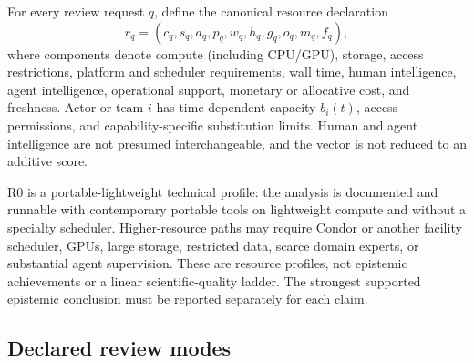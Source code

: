 \documentclass[11pt]{article}
\begin{document}
For every review request $q$, define the canonical resource declaration
\begin{equation}
 r_q=(c_q,s_q,a_q,p_q,w_q,h_q,g_q,o_q,m_q,f_q),
 \label{eq:resource}
\end{equation}
where components denote compute (including CPU/GPU), storage, access restrictions, platform and scheduler requirements, wall time, human intelligence, agent intelligence, operational support, monetary or allocative cost, and freshness. Actor or team $i$ has time-dependent capacity $b_i(t)$, access permissions, and capability-specific substitution limits. Human and agent intelligence are not presumed interchangeable, and the vector is not reduced to an additive score.

R0 is a portable-lightweight technical profile: the analysis is documented and runnable with contemporary portable tools on lightweight compute and without a specialty scheduler. Higher-resource paths may require Condor or another facility scheduler, GPUs, large storage, restricted data, scarce domain experts, or substantial agent supervision. These are resource profiles, not epistemic achievements or a linear scientific-quality ladder. The strongest supported epistemic conclusion must be reported separately for each claim.

\subsection{Declared review modes}
\end{document}
